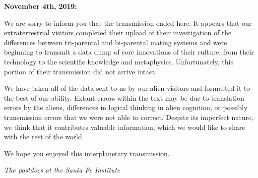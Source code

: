 
\textbf{November 4th, 2019:} 

\vspace{0.5cm}

We are sorry to inform you that the transmission ended here. It appears that our extraterrestrial visitors completed their upload of their investigation of the differences between tri-parental and bi-parental mating systems and were beginning to transmit a data dump of core innovations of their culture, from their technology to the scientific knowledge and metaphysics. Unfortunately, this portion of their transmission did not arrive intact.

We have taken all of the data sent to us by our alien visitors and formatted it to the best of our ability. Extant errors within the text may be due to translation errors by the aliens, differences in logical thinking in alien cognition, or possibly transmission errors that we were not able to correct. Despite its imperfect nature, we think that it contributes valuable information, which we would like to share with the rest of the world.

We hope you enjoyed this interplanetary transmission. 

\vspace{0.5cm}
\emph{The postdocs at the Santa Fe Institute}
